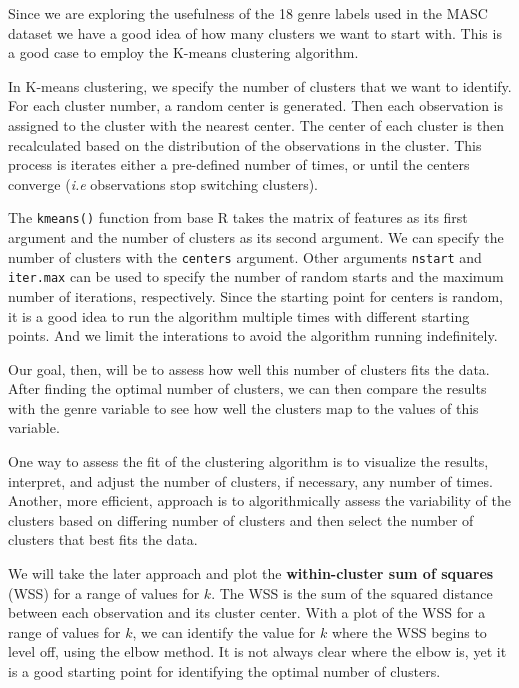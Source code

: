 \documentclass[
  letterpaper,
  krantz1]{latex/krantz-mod}
\theoremstyle{definition}
\theoremstyle{definition}
\theoremstyle{remark}
\begin{document}
Since we are exploring the usefulness of the 18 genre labels used in the
MASC dataset we have a good idea of how many clusters we want to start
with. This is a good case to employ the K-means clustering algorithm.

In K-means clustering, we specify the number of clusters that we want to
identify. For each cluster number, a random center is generated. Then
each observation is assigned to the cluster with the nearest center. The
center of each cluster is then recalculated based on the distribution of
the observations in the cluster. This process is iterates either a
pre-defined number of times, or until the centers converge (\emph{i.e}
observations stop switching clusters).

The \texttt{kmeans()} function from base R takes the matrix of features
as its first argument and the number of clusters as its second argument.
We can specify the number of clusters with the \texttt{centers}
argument. Other arguments \texttt{nstart} and \texttt{iter.max} can be
used to specify the number of random starts and the maximum number of
iterations, respectively. Since the starting point for centers is
random, it is a good idea to run the algorithm multiple times with
different starting points. And we limit the interations to avoid the
algorithm running indefinitely.

Our goal, then, will be to assess how well this number of clusters fits
the data. After finding the optimal number of clusters, we can then
compare the results with the genre variable to see how well the clusters
map to the values of this variable.

One way to assess the fit of the clustering algorithm is to visualize
the results, interpret, and adjust the number of clusters, if necessary,
any number of times. Another, more efficient, approach is to
algorithmically assess the variability of the clusters based on
differing number of clusters and then select the number of clusters that
best fits the data.

We will take the later approach and plot the \textbf{within-cluster sum
of squares} (WSS) for a range of values for \(k\). The WSS is the sum of
the squared distance between each observation and its cluster center.
With a plot of the WSS for a range of values for \(k\), we can identify
the value for \(k\) where the WSS begins to level off, using the elbow
method. It is not always clear where the elbow is, yet it is a good
starting point for identifying the optimal number of clusters.
\end{document}

